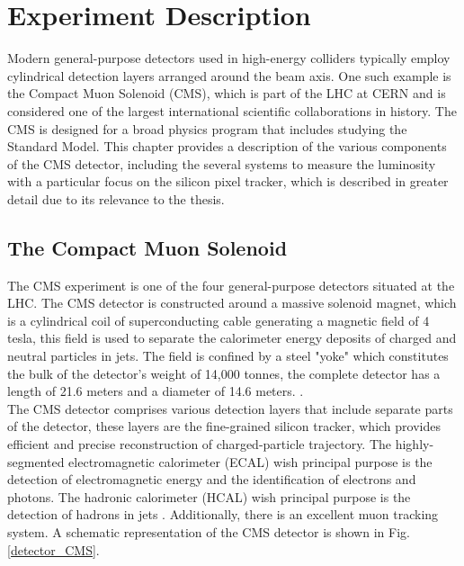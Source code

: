 \chapter{Experiment Description}
Modern general-purpose detectors used in high-energy colliders typically employ cylindrical detection layers arranged around the beam axis. One such example is the Compact Muon Solenoid (CMS), which is part of the LHC at CERN and is considered one of the largest international scientific collaborations in history. The CMS is designed for a broad physics program that includes studying the Standard Model. This chapter provides a description of the various components of the CMS detector, including the several systems to measure the luminosity with a particular focus on the silicon pixel tracker, which is described in greater detail due to its relevance to the thesis.
 
\section{The Compact Muon Solenoid}

The CMS experiment is one of the four general-purpose detectors situated at the LHC. The CMS detector is constructed around a massive solenoid magnet, which is a cylindrical coil of superconducting cable generating a magnetic field of 4 tesla, this field is used to separate the calorimeter energy deposits of charged and neutral particles in jets. The field is confined by a steel "yoke" which constitutes the bulk of the detector's weight of 14,000 tonnes, the complete detector has a length of 21.6 meters and a diameter of 14.6 meters.  \cite{CMS_Exp_2008}. \\

The CMS detector comprises various detection layers that include separate parts of the detector, these layers are the fine-grained silicon tracker, which provides efficient and precise reconstruction of charged-particle trajectory. The highly-segmented electromagnetic calorimeter (ECAL) wish principal purpose is the detection of  electromagnetic energy and the identification of electrons and photons. The hadronic calorimeter (HCAL) wish principal purpose is the detection of hadrons in jets  \cite{CMS_Exp_2008}. Additionally, there is an excellent muon tracking system. A schematic representation of the CMS detector is shown in Fig. \ref{detector_CMS}.

